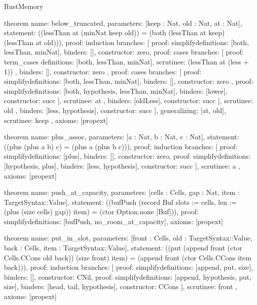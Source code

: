 \begin{lexlean}{RustMemory}
\begin{semanticmodule}
theorem{
  name: below_truncated,
  parameters: [keep : Nat, old : Nat, at : Nat],
  statement: ((lessThan at (minNat keep old)) = (both (lessThan at keep) (lessThan at old))),
  proof: induction{
    branches: [
      {proof: simplify{definitions: [both, lessThan, minNat]}, binders: [], constructor: zero},
      {
        proof: cases{
          branches: [
            {
              proof: term_cases{
                definitions: [both, lessThan, minNat],
                scrutinee: (lessThan at (less + 1))
              },
              binders: [],
              constructor: zero
            },
            {
              proof: cases{
                branches: [
                  {
                    proof: simplify{definitions: [both, lessThan, minNat]},
                    binders: [],
                    constructor: zero
                  },
                  {
                    proof: simplify{definitions: [both, hypothesis, lessThan, minNat]},
                    binders: [lower],
                    constructor: succ
                  }
                ],
                scrutinee: at
              },
              binders: [oldLess],
              constructor: succ
            }
          ],
          scrutinee: old
        },
        binders: [less, hypothesis],
        constructor: succ
      }
    ],
    generalizing: [at, old],
    scrutinee: keep
  },
  axioms: [propext]
}

theorem{
  name: plus_assoc,
  parameters: [a : Nat, b : Nat, c : Nat],
  statement: ((plus (plus a b) c) = (plus a (plus b c))),
  proof: induction{
    branches: [
      {proof: simplify{definitions: [plus]}, binders: [], constructor: zero},
      {
        proof: simplify{definitions: [hypothesis, plus]},
        binders: [less, hypothesis],
        constructor: succ
      }
    ],
    scrutinee: a
  },
  axioms: [propext]
}

theorem{
  name: push_at_capacity,
  parameters: [cells : Cells, gap : Nat, item : TargetSyntax::Value],
  statement: ((bufPush (record Buf {slots := cells, len := (plus (size cells) gap)}) item) = (ctor Option.none [Buf])),
  proof: simplify{definitions: [bufPush, no_room_at_capacity]},
  axioms: [propext]
}

theorem{
  name: put_in_slot,
  parameters: [front : Cells, old : TargetSyntax::Value, back : Cells, item : TargetSyntax::Value],
  statement: ((put (append front (ctor Cells.CCons old back)) (size front) item) = (append front (ctor Cells.CCons item back))),
  proof: induction{
    branches: [
      {proof: simplify{definitions: [append, put, size]}, binders: [], constructor: CNil},
      {
        proof: simplify{definitions: [append, hypothesis, put, size]},
        binders: [head, tail, hypothesis],
        constructor: CCons
      }
    ],
    scrutinee: front
  },
  axioms: [propext]
}


\end{semanticmodule}
\end{lexlean}
